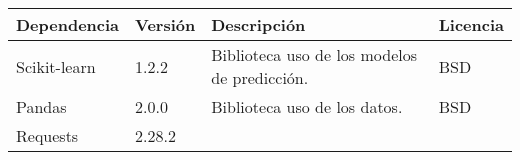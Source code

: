 \begin{longtable}[]{@{}llll@{}} 
\toprule 
\begin{minipage}[b]{0.18\columnwidth}\raggedright\strut
Dependencia\strut
\end{minipage} & \begin{minipage}[b]{0.10\columnwidth}\raggedright\strut
Versión\strut
\end{minipage} & \begin{minipage}[b]{0.49\columnwidth}\raggedright\strut
Descripción\strut
\end{minipage} & \begin{minipage}[b]{0.11\columnwidth}\raggedright\strut
Licencia\strut
\end{minipage}\tabularnewline
\midrule
\endhead
\begin{minipage}[t]{0.18\columnwidth}\raggedright\strut
Scikit-learn\strut
\end{minipage} & \begin{minipage}[t]{0.08\columnwidth}\raggedright\strut
1.2.2\strut
\end{minipage} & \begin{minipage}[t]{0.49\columnwidth}\raggedright\strut
Biblioteca uso de los modelos de predicción.\strut
\end{minipage} & \begin{minipage}[t]{0.11\columnwidth}\raggedright\strut
BSD\strut
\end{minipage}\tabularnewline
\begin{minipage}[t]{0.18\columnwidth}\raggedright\strut
Pandas\strut
\end{minipage} & \begin{minipage}[t]{0.08\columnwidth}\raggedright\strut
2.0.0\strut
\end{minipage} & \begin{minipage}[t]{0.49\columnwidth}\raggedright\strut
Biblioteca uso de los datos.\strut
\end{minipage} & \begin{minipage}[t]{0.11\columnwidth}\raggedright\strut
BSD\strut
\end{minipage}\tabularnewline
\begin{minipage}[t]{0.18\columnwidth}\raggedright\strut
Requests\strut
\end{minipage} & \begin{minipage}[t]{0.08\columnwidth}\raggedright\strut
2.28.2\strut
\end{minipage} & \begin{minipage}[t]{0.49\columnwidth}\raggedright\strut

\end{minipage}
\end{longtable}
